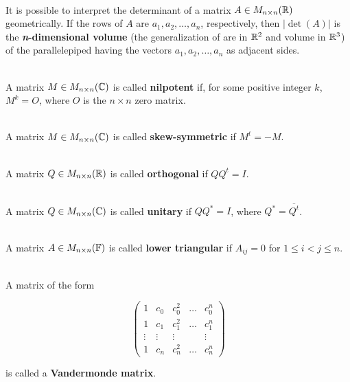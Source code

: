 \begin{definition}
	\hfill\\
	It is possible to interpret the determinant of a matrix $A \in M_{n \times n}(\mathbb{R})$ geometrically. If the rows of $A$ are $a_1, a_2, \dots, a_n$, respectively, then $|\det(A)|$ is the \textbf{\textit{n}-dimensional volume} (the generalization of are in $\mathbb{R}^2$ and volume in $\mathbb{R}^3$) of the parallelepiped having the vectors $a_1, a_2, \dots, a_n$ as adjacent sides.
\end{definition}

\begin{definition}
	\hfill\\
	A matrix $M \in M_{n \times n}(\mathbb{C})$ is called \textbf{nilpotent} if, for some positive integer $k$, $M^k = O$, where $O$ is the $n \times n$ zero matrix.
\end{definition}

\begin{definition}
	\hfill\\
	A matrix $M \in M_{n \times n}(\mathbb{C})$ is called \textbf{skew-symmetric} if $M^t = -M$.
\end{definition}

\begin{definition}
	\hfill\\
	A matrix $Q \in M_{n \times n}(\mathbb{R})$ is called \textbf{orthogonal} if $QQ^t = I$.
\end{definition}

\begin{definition}
	\hfill\\
	A matrix $Q \in M_{n \times n}(\mathbb{C})$ is called \textbf{unitary} if $QQ^* = I$, where $Q^* = \overline{Q^t}$.
\end{definition}

\begin{definition}
	\hfill\\
	A matrix $A \in M_{n \times n}(\mathbb{F})$ is called \textbf{lower triangular} if $A_{ij}=0$ for $1 \leq i < j \leq n$.
\end{definition}

\begin{definition}
	\hfill\\
	A matrix of the form
	
	\[\begin{pmatrix}
		1 & c_0 & c_0^2 & \dots & c_0^n \\
		1 & c_1 & c_1^2 & \dots & c_1^n \\
		\vdots & \vdots & \vdots & &\vdots \\
		1 & c_n & c_n^2 & \dots & c_n^n
	\end{pmatrix}\]
	
	is called a \textbf{Vandermonde matrix}.
\end{definition}

